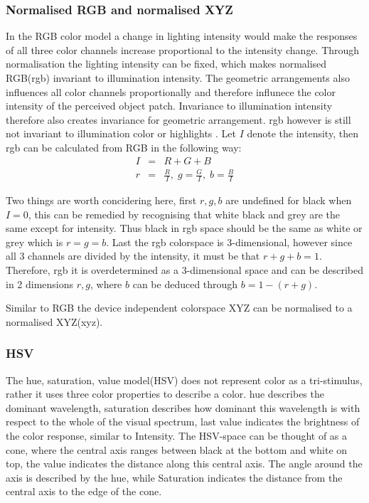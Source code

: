 \documentclass[a4paper,11pt]{article}
\begin{document}
		
\subsubsection{Normalised RGB and normalised XYZ}

In the RGB color model a change in lighting intensity would make the responses of all three color channels increase proportional to the intensity change. Through normalisation the lighting intensity can be fixed, which makes normalised RGB(rgb) invariant to illumination intensity. The geometric arrangements also influences all color channels proportionally and therefore influnece the color intensity of the perceived object patch. Invariance to illumination intensity therefore also creates invariance for geometric arrangement. rgb however is still not invariant to illumination color or highlights \cite{gevers_invariant}. 
Let $I$ denote the intensity, then rgb can be calculated from RGB in the following way:
\begin{eqnarray}
\label{eq:rgb}
I &=& R+G+B \\
r &=& \frac{R}{I},\; g = \frac{G}{I},\; b = \frac{B}{I}
\end{eqnarray}

Two things are worth concidering here, first $r,g,b$ are undefined for black when $I=0$, this can be remedied by recognising that white black and grey are the same except for intensity. Thus black in rgb space should be the same as white or grey which is $r=g=b$. Last the rgb colorspace is 3-dimensional, however since all 3 channels are divided by the intensity, it must be that $r+g+b=1$. Therefore, rgb it is overdetermined as a 3-dimensional space and can be described in 2 dimensions $r,g$, where $b$ can be deduced through $b=1-(r+g)$.

Similar to RGB the device independent colorspace XYZ can be normalised to a normalised XYZ(xyz).		
		
\subsubsection{HSV}
The hue, saturation, value model(HSV) does not represent color as a tri-stimulus, rather it uses three color properties to describe a color. hue describes the dominant wavelength, saturation describes how dominant this wavelength is with respect to the whole of the visual spectrum, last value indicates the brightness of the color response, similar to Intensity. The HSV-space can be thought of as a cone, where the central axis ranges between black at the bottom and white on top, the value indicates the distance along this central axis. The angle around the axis is described by the hue, while Saturation indicates the distance from the central axis to the edge of the cone. 
\end{document}
